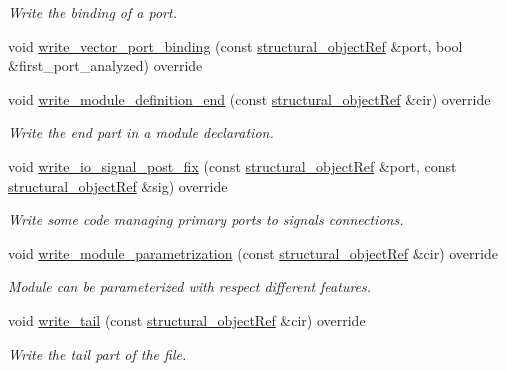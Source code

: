 \begin{DoxyCompactItemize}
\begin{DoxyCompactList}\small\item\em Write the binding of a port. \end{DoxyCompactList}\item 
void \hyperlink{classverilog__writer_ab9c4a8bd3452e3bb5d3efd13638b48c3}{write\+\_\+vector\+\_\+port\+\_\+binding} (const \hyperlink{structural__objects_8hpp_a8ea5f8cc50ab8f4c31e2751074ff60b2}{structural\+\_\+object\+Ref} \&port, bool \&first\+\_\+port\+\_\+analyzed) override
\item 
void \hyperlink{classverilog__writer_aeb32328c5b805c13c4fc86a5576e82d4}{write\+\_\+module\+\_\+definition\+\_\+end} (const \hyperlink{structural__objects_8hpp_a8ea5f8cc50ab8f4c31e2751074ff60b2}{structural\+\_\+object\+Ref} \&cir) override
\begin{DoxyCompactList}\small\item\em Write the end part in a module declaration. \end{DoxyCompactList}\item 
void \hyperlink{classverilog__writer_a4f2930898accd739d654c4afb425814c}{write\+\_\+io\+\_\+signal\+\_\+post\+\_\+fix} (const \hyperlink{structural__objects_8hpp_a8ea5f8cc50ab8f4c31e2751074ff60b2}{structural\+\_\+object\+Ref} \&port, const \hyperlink{structural__objects_8hpp_a8ea5f8cc50ab8f4c31e2751074ff60b2}{structural\+\_\+object\+Ref} \&sig) override
\begin{DoxyCompactList}\small\item\em Write some code managing primary ports to signals connections. \end{DoxyCompactList}\item 
void \hyperlink{classverilog__writer_aa097c810dcf1d52f5559ad89def6da17}{write\+\_\+module\+\_\+parametrization} (const \hyperlink{structural__objects_8hpp_a8ea5f8cc50ab8f4c31e2751074ff60b2}{structural\+\_\+object\+Ref} \&cir) override
\begin{DoxyCompactList}\small\item\em Module can be parameterized with respect different features. \end{DoxyCompactList}\item 
void \hyperlink{classverilog__writer_ab65a214d6736e0fa5de6f2d5d085227f}{write\+\_\+tail} (const \hyperlink{structural__objects_8hpp_a8ea5f8cc50ab8f4c31e2751074ff60b2}{structural\+\_\+object\+Ref} \&cir) override
\begin{DoxyCompactList}\small\item\em Write the tail part of the file. \end{DoxyCompactList}\item 

\end{DoxyCompactItemize}
